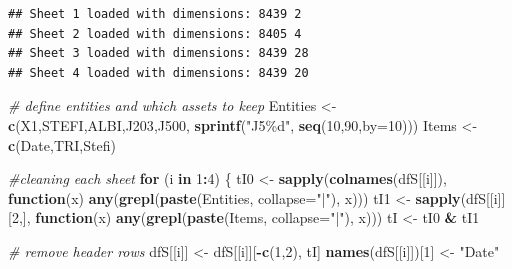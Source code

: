 \documentclass[
  12pt,
]{article}
\newenvironment{Shaded}{\begin{snugshade}}{\end{snugshade}}
\newcommand{\AttributeTok}[1]{\textcolor[rgb]{0.13,0.29,0.53}{#1}}
\newcommand{\CommentTok}[1]{\textcolor[rgb]{0.56,0.35,0.01}{\textit{#1}}}
\newcommand{\ControlFlowTok}[1]{\textcolor[rgb]{0.13,0.29,0.53}{\textbf{#1}}}
\newcommand{\DecValTok}[1]{\textcolor[rgb]{0.00,0.00,0.81}{#1}}
\newcommand{\FunctionTok}[1]{\textcolor[rgb]{0.13,0.29,0.53}{\textbf{#1}}}
\newcommand{\NormalTok}[1]{#1}
\newcommand{\OtherTok}[1]{\textcolor[rgb]{0.56,0.35,0.01}{#1}}
\newcommand{\SpecialCharTok}[1]{\textcolor[rgb]{0.81,0.36,0.00}{\textbf{#1}}}
\newcommand{\StringTok}[1]{\textcolor[rgb]{0.31,0.60,0.02}{#1}}
\begin{document}
\begin{verbatim}
## Sheet 1 loaded with dimensions: 8439 2 
## Sheet 2 loaded with dimensions: 8405 4 
## Sheet 3 loaded with dimensions: 8439 28 
## Sheet 4 loaded with dimensions: 8439 20
\end{verbatim}

\begin{Shaded}
\begin{Highlighting}[]
\CommentTok{\# define entities and which assets to keep}
\NormalTok{Entities }\OtherTok{\textless{}{-}} \FunctionTok{c}\NormalTok{(}\StringTok{\textquotesingle{}X1\textquotesingle{}}\NormalTok{,}\StringTok{\textquotesingle{}STEFI\textquotesingle{}}\NormalTok{,}\StringTok{\textquotesingle{}ALBI\textquotesingle{}}\NormalTok{,}\StringTok{\textquotesingle{}J203\textquotesingle{}}\NormalTok{,}\StringTok{\textquotesingle{}J500\textquotesingle{}}\NormalTok{, }\FunctionTok{sprintf}\NormalTok{(}\StringTok{"J5\%d"}\NormalTok{, }\FunctionTok{seq}\NormalTok{(}\DecValTok{10}\NormalTok{,}\DecValTok{90}\NormalTok{,}\AttributeTok{by=}\DecValTok{10}\NormalTok{)))}
\NormalTok{Items    }\OtherTok{\textless{}{-}} \FunctionTok{c}\NormalTok{(}\StringTok{\textquotesingle{}Date\textquotesingle{}}\NormalTok{,}\StringTok{\textquotesingle{}TRI\textquotesingle{}}\NormalTok{,}\StringTok{\textquotesingle{}Stefi\textquotesingle{}}\NormalTok{)}

\CommentTok{\#cleaning each sheet}
\ControlFlowTok{for}\NormalTok{ (i }\ControlFlowTok{in} \DecValTok{1}\SpecialCharTok{:}\DecValTok{4}\NormalTok{) \{}
\NormalTok{  tI0 }\OtherTok{\textless{}{-}} \FunctionTok{sapply}\NormalTok{(}\FunctionTok{colnames}\NormalTok{(dfS[[i]]), }\ControlFlowTok{function}\NormalTok{(x) }\FunctionTok{any}\NormalTok{(}\FunctionTok{grepl}\NormalTok{(}\FunctionTok{paste}\NormalTok{(Entities, }\AttributeTok{collapse=}\StringTok{"|"}\NormalTok{), x)))}
\NormalTok{  tI1 }\OtherTok{\textless{}{-}} \FunctionTok{sapply}\NormalTok{(dfS[[i]][}\DecValTok{2}\NormalTok{,], }\ControlFlowTok{function}\NormalTok{(x) }\FunctionTok{any}\NormalTok{(}\FunctionTok{grepl}\NormalTok{(}\FunctionTok{paste}\NormalTok{(Items, }\AttributeTok{collapse=}\StringTok{"|"}\NormalTok{), x)))}
\NormalTok{  tI  }\OtherTok{\textless{}{-}}\NormalTok{ tI0 }\SpecialCharTok{\&}\NormalTok{ tI1}
  
  \CommentTok{\# remove header rows}
\NormalTok{  dfS[[i]] }\OtherTok{\textless{}{-}}\NormalTok{ dfS[[i]][}\SpecialCharTok{{-}}\FunctionTok{c}\NormalTok{(}\DecValTok{1}\NormalTok{,}\DecValTok{2}\NormalTok{), tI]}
  \FunctionTok{names}\NormalTok{(dfS[[i]])[}\DecValTok{1}\NormalTok{] }\OtherTok{\textless{}{-}} \StringTok{"Date"}
  

\end{Highlighting}
\end{Shaded}
\end{document}
